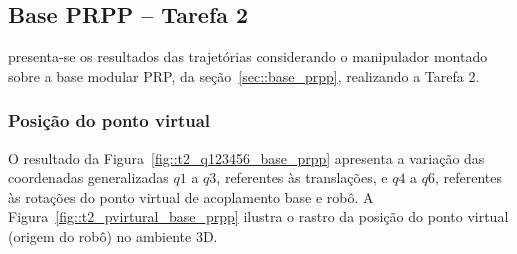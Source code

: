 \clearpage
\subsection{Base PRPP -- Tarefa 2}

presenta-se os resultados das trajetórias considerando o manipulador montado
sobre a base modular PRP, da seção~\ref{sec::base_prpp}, realizando a Tarefa 2.

\subsubsection{Posição do ponto virtual}

O resultado da Figura~\ref{fig::t2_q123456_base_prpp} apresenta a variação das
coordenadas generalizadas $q1$ a $q3$, referentes às translações, e $q4$ a $q6$,
referentes às rotações do ponto virtual de acoplamento base e robô. A
Figura~\ref{fig::t2_pvirtural_base_prpp} ilustra o rastro da posição do ponto
virtual (origem do robô) no ambiente 3D.

